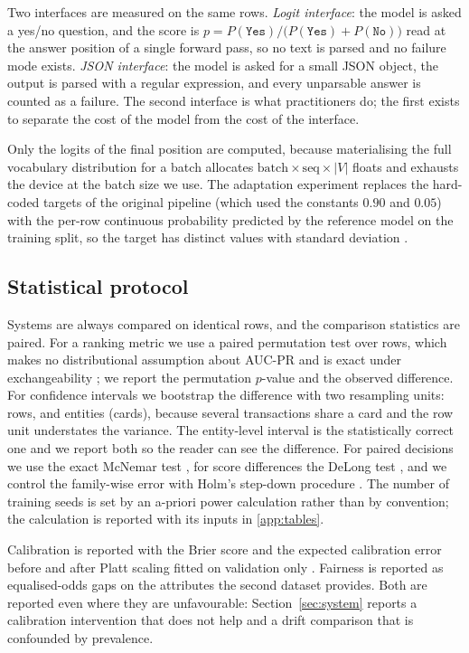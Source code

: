 Two interfaces are measured on the same rows.
\emph{Logit interface}: the model is asked a yes/no question, and the score is
$p=P(\texttt{Yes})/\big(P(\texttt{Yes})+P(\texttt{No})\big)$ read at the answer
position of a single forward pass, so no text is parsed and no failure mode
exists. \emph{JSON interface}: the model is asked for a small JSON object, the
output is parsed with a regular expression, and every unparsable answer is counted
as a failure. The second interface is what practitioners do; the first exists to
separate the cost of the model from the cost of the interface.

Only the logits of the final position are computed, because materialising the full
vocabulary distribution for a batch allocates $\text{batch}\times\text{seq}\times
\lvert V\rvert$ floats and exhausts the device at the batch size we use. The
adaptation experiment replaces the hard-coded targets of the original pipeline
(which used the constants $0.90$ and $0.05$) with the per-row continuous
probability predicted by the reference model on the training split, so the target
has \TargetDistinct{} distinct values with standard deviation \TargetSd.

\subsection{Statistical protocol}

Systems are always compared on identical rows, and the comparison statistics are
paired. For a ranking metric we use a paired permutation test over rows, which
makes no distributional assumption about AUC-PR and is exact under exchangeability
\cite{efron1993bootstrap}; we report the permutation $p$-value and the observed
difference. For confidence intervals we bootstrap the difference with two
resampling units: rows, and entities (cards), because several transactions share a
card and the row unit understates the variance. The entity-level interval is the
statistically correct one and we report both so the reader can see the difference.
For paired decisions we use the exact McNemar test \cite{mcnemar1947note}, for
score differences the DeLong test \cite{delong1988comparing}, and we control the
family-wise error with Holm's step-down procedure \cite{holm1979simple}. The number
of training seeds is set by an a-priori power calculation rather than by
convention; the calculation is reported with its inputs in
\ref{app:tables}.

Calibration is reported with the Brier score and the expected calibration error
before and after Platt scaling fitted on validation only
\cite{guo2017calibration}. Fairness is reported as equalised-odds gaps
\cite{hardt2016equality} on the attributes the second dataset provides. Both are
reported even where they are unfavourable: Section~\ref{sec:system} reports a
calibration intervention that does not help and a drift comparison that is
confounded by prevalence.
